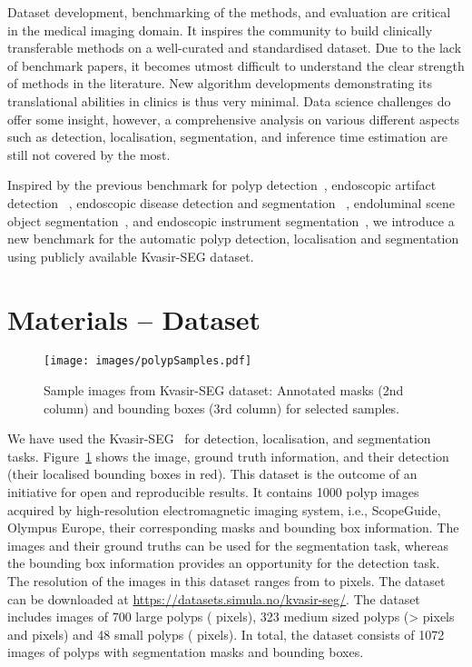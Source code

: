 \documentclass[journal]{IEEEtran}
\begin{document}
Dataset development, benchmarking of the methods, and evaluation are critical in the medical imaging domain. It inspires the community to build clinically transferable methods on a well-curated and standardised dataset. Due to the lack of benchmark papers, it becomes utmost difficult to understand the clear strength of methods in the literature. New algorithm developments demonstrating its translational abilities in clinics is thus very minimal. Data science challenges do offer some insight, however, a comprehensive analysis on various different aspects such as detection, localisation, segmentation, and inference time estimation are still not covered by the most.

Inspired by the previous benchmark for polyp detection~\cite{bernal2017comparative}, endoscopic artifact detection ~\cite{ali2019endoscopy}, endoscopic disease detection and segmentation ~\cite{ali2020endoscopy}, endoluminal scene object segmentation~\cite{vazquez2017benchmark}, and endoscopic instrument segmentation~\cite{ross2020comparative}, we introduce a new benchmark for the automatic polyp detection, localisation and segmentation using publicly available Kvasir-SEG dataset.







\section{Materials -- Dataset}
\label{sec:materials}
\begin{figure}[t!]
    \centering
    \texttt{[image: images/polypSamples.pdf]}
    \caption{{Sample images from Kvasir-SEG dataset:} Annotated masks (2nd column) and bounding boxes (3rd column) for selected samples.}
    \label{fig:kvasir_sample}
\end{figure}









We have used the Kvasir-SEG~\cite{jha2020kvasir} for detection, localisation, and segmentation tasks. Figure~\ref{fig:kvasir_sample} shows the image, ground truth information, and their detection (their localised bounding boxes in red). This dataset is the outcome of an initiative for open and reproducible results. It contains 1000 polyp images acquired by high-resolution electromagnetic imaging system, i.e., ScopeGuide, Olympus Europe, their corresponding masks and bounding box information. The images and their ground truths can be used for the segmentation task, whereas the bounding box information provides an opportunity for the detection task. The resolution of the images in this dataset ranges from   to  pixels. The dataset can be downloaded at \url{https://datasets.simula.no/kvasir-seg/}. The dataset includes images of 700 large polyps ( pixels), 323 medium sized polyps (>  pixels and  pixels) and 48 small polyps ( pixels). In total, the dataset consists of 1072 images of polyps with segmentation masks and bounding boxes.
\end{document}
